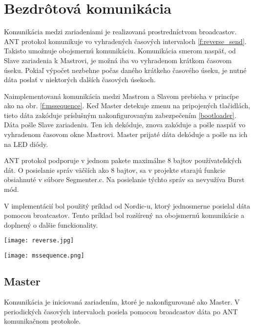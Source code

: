 \documentclass[12pt,a4wide,oneside,openright]{report}
\begin{document}
\section{Bezdrôtová komunikácia}
Komunikácia medzi zariadeniami je realizovaná prostredníctvom broadcastov. 
ANT protokol komunikuje vo vyhradených časových intervaloch \ref{f:reverse_send}. Takisto umožnuje obojsmernú komunikáciu. Komunikácia smerom naspäť, od Slave zariadenia k Mastrovi, je možná iba vo vyhradenom krátkom časovom úseku. Pokiaľ výpočet nezbehne počas daného krátkeho časového úseku, je nutné dáta poslať v niektorých ďalších časových úsekoch.

Naimplementovaná komunikácia medzi Mastrom a Slavom prebieha v princípe ako na obr. \ref{f:mssequence}. Keď Master detekuje zmenu na pripojených tlačidlách, tieto dáta zakóduje príslušným nakonfigurovaným zabezpečením \ref{bootloader}. Dáta pošle Slave zariadeniu. Ten ich dekóduje, znova zakóduje a pošle naspäť vo vyhradenom časovom okne Mastrovi. Master prijaté dáta dekóduje a pošle na ich na LED diódy.

ANT protokol podporuje v jednom pakete maximálne 8 bajtov používateľských dát. O posielanie správ väčších ako 8 bajtov, sa v projekte starajú funkcie obsiahnuté v súbore Segmenter.c. Na posielanie týchto správ sa nevyužíva Burst mód.

V implementácií bol použitý príklad od Nordic-u, ktorý jednosmerne posielal dáta pomocou broatcastov. Tento príklad bol rozšírený na obojsmernú komunikácie a doplnený o ďalšie funckionality.

	\begin{figure*}[h]
		\centering
		\texttt{[image: reverse.jpg]}
		\caption{Obojsmerná komunikácia po ANT protokole \cite{ANT}.}
		\label{f:reverse_send}
	\end{figure*}


	\begin{figure*}[h]
		\centering
		\texttt{[image: mssequence.png]}
		\caption{Komunikácia medzi Master a Slave zariadením.}
		\label{f:mssequence}
	\end{figure*}

\subsection{Master}
	Komunikácia je iniciovaná zariadením, ktoré je nakonfigurované ako Master.
	V periodických časových intervaloch posiela pomocou broadcastov dáta po ANT komunikačnom protokole.
	
\end{document}
